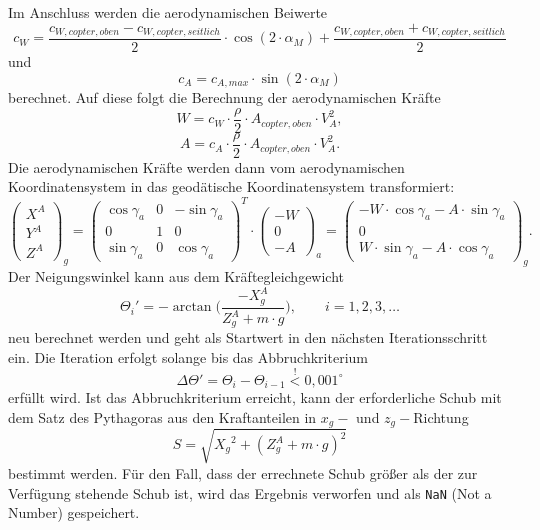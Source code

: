 Im Anschluss werden die aerodynamischen Beiwerte 
\begin{equation}
	c_W = \frac{c_{W,copter,oben}-c_{W,copter,seitlich}}{2}\cdot \cos(2\cdot \alpha_M)+\frac{c_{W,copter,oben}+c_{W,copter,seitlich}}{2}
\end{equation} und 
\begin{equation}
	c_A = c_{A,max}\cdot \sin(2\cdot \alpha_M)
\end{equation}
berechnet. Auf diese folgt die Berechnung der aerodynamischen Kräfte
\begin{equation}
	W = c_W\cdot \frac{\rho}{2}\cdot A_{copter,oben}\cdot V_A^2, \label{eq:widerstand}
\end{equation}
\begin{equation}
	A = c_A\cdot \frac{\rho}{2}\cdot A_{copter,oben}\cdot V_A^2.
	\label{eq:auftrieb}
\end{equation}
Die aerodynamischen Kräfte werden dann vom aerodynamischen Koordinatensystem in das geodätische Koordinatensystem transformiert:
\begin{equation}
	\begin{pmatrix} X^A \\ Y^A \\Z^A \end{pmatrix}_g = \begin{pmatrix} \cos\gamma_a & 0 & -\sin\gamma_a \\ 0 & 1 & 0 \\ \sin\gamma_a & 0 & \cos\gamma_a \end{pmatrix}^T\cdot \begin{pmatrix} -W \\ 0 \\ -A \end{pmatrix}_a = \begin{pmatrix} -W\cdot\cos\gamma_a-A\cdot\sin\gamma_a \\ 0 \\ W\cdot\sin\gamma_a-A\cdot\cos\gamma_a \end{pmatrix}_g.
\end{equation}
Der Neigungswinkel kann aus dem Kräftegleichgewicht
\begin{equation}
	\Theta_i' = -\arctan\Big(\frac{-X_g^A}{Z_g^A + m\cdot g}\Big), \qquad i =1,2,3,\dots
	\label{eq:neigungswinkel}
\end{equation}
neu berechnet werden und geht als Startwert in den nächsten Iterationsschritt ein. Die Iteration erfolgt solange bis das Abbruchkriterium
\begin{equation}
	\Delta\Theta' = \Theta_i-\Theta_{i-1}\stackrel{!}{<}0,001^{\circ}
\end{equation}
erfüllt wird. 
Ist das Abbruchkriterium erreicht, kann der erforderliche Schub mit dem Satz des Pythagoras aus den Kraftanteilen in \(x_g-\) und \(z_g-\)Richtung
\begin{equation}
	S = \sqrt{{X_g}^2+(Z_g^A+m\cdot g)^2}
	\label{eq:schub_multicopter}
\end{equation}
bestimmt werden.
Für den Fall, dass der errechnete Schub größer als der zur Verfügung stehende Schub ist, wird das Ergebnis verworfen und als \texttt{NaN} (Not a Number) gespeichert.



